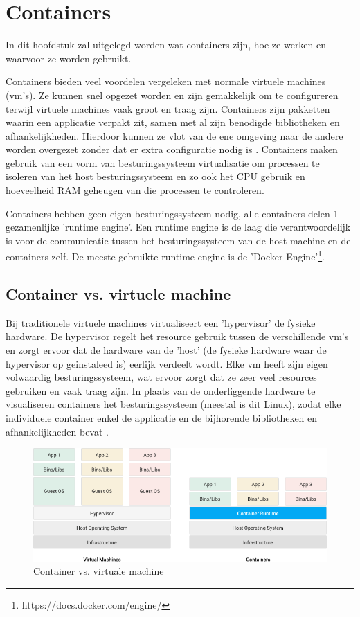 \section{Containers}
In dit hoofdstuk zal uitgelegd worden wat containers zijn, hoe ze werken en waarvoor ze worden gebruikt.

Containers bieden veel voordelen vergeleken met normale virtuele machines (vm's). Ze kunnen snel opgezet worden en zijn gemakkelijk om te configureren terwijl virtuele machines vaak groot en traag zijn. Containers zijn pakketten waarin een applicatie verpakt zit, samen met al zijn benodigde bibliotheken en afhankelijkheden. Hierdoor kunnen ze vlot van de ene omgeving naar de andere worden overgezet zonder dat er extra configuratie nodig is \autocite{Education2019}. Containers maken gebruik van een vorm van besturingssysteem virtualisatie om processen te isoleren van het host besturingssysteem en zo ook het CPU gebruik en hoeveelheid RAM geheugen van die processen te controleren.\autocite{Docker2018}

Containers hebben geen eigen besturingssysteem nodig, alle containers delen 1 gezamenlijke 'runtime engine'. Een runtime engine is de laag die verantwoordelijk is voor de communicatie tussen het besturingssysteem van de host machine en de containers zelf. De meeste gebruikte runtime engine is de 'Docker Engine'\footnote{https://docs.docker.com/engine/}.

\subsection{Container vs. virtuele machine}
Bij traditionele virtuele machines virtualiseert een 'hypervisor' de fysieke hardware. De hypervisor regelt het resource gebruik tussen de verschillende vm's en zorgt ervoor dat de hardware van de 'host' (de fysieke hardware waar de hypervisor op geinstaleed is) eerlijk verdeelt wordt. Elke vm heeft zijn eigen volwaardig besturingssysteem, wat ervoor zorgt dat ze zeer veel resources gebruiken en vaak traag zijn. In plaats van de onderliggende hardware te visualiseren containers het besturingssysteem (meestal is dit Linux), zodat elke individuele container enkel de applicatie en de bijhorende bibliotheken en afhankelijkheden bevat \autocite{Education2020}.

\begin{figure}[ht]
    \centering
    \includegraphics[width=\linewidth]{img/container-vs-vm.png}
    \caption{Container vs. virtuale machine \autocite{Google2016}}
    \label{fig:example}
\end{figure}



